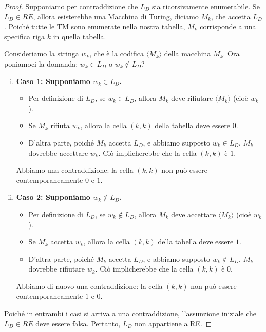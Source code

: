 \documentclass[a4paper]{article}
\begin{document}
\begin{proof}
Supponiamo per contraddizione che $L_D$ sia ricorsivamente enumerabile. Se $L_D \in RE$, allora esisterebbe una Macchina di Turing, diciamo $M_k$, che accetta $L_D$. Poiché tutte le TM sono enumerate nella nostra tabella, $M_k$ corrisponde a una specifica riga $k$ in quella tabella.

Consideriamo la stringa $w_k$, che è la codifica $\langle M_k \rangle$ della macchina $M_k$.
Ora poniamoci la domanda: $w_k \in L_D$ o $w_k \notin L_D$?

\begin{enumerate}[(i)]
    \item \textbf{Caso 1: Supponiamo $w_k \in L_D$.}
    \begin{itemize}
        \item Per definizione di $L_D$, se $w_k \in L_D$, allora $M_k$ deve rifiutare $\langle M_k \rangle$ (cioè $w_k$).
        \item Se $M_k$ rifiuta $w_k$, allora la cella $(k,k)$ della tabella deve essere $0$.
        \item D'altra parte, poiché $M_k$ accetta $L_D$, e abbiamo supposto $w_k \in L_D$, $M_k$ dovrebbe accettare $w_k$. Ciò implicherebbe che la cella $(k,k)$ è $1$.
    \end{itemize}
    Abbiamo una contraddizione: la cella $(k,k)$ non può essere contemporaneamente $0$ e $1$.

    \item \textbf{Caso 2: Supponiamo $w_k \notin L_D$.}
    \begin{itemize}
        \item Per definizione di $L_D$, se $w_k \notin L_D$, allora $M_k$ deve accettare $\langle M_k \rangle$ (cioè $w_k$).
        \item Se $M_k$ accetta $w_k$, allora la cella $(k,k)$ della tabella deve essere $1$.
        \item D'altra parte, poiché $M_k$ accetta $L_D$, e abbiamo supposto $w_k \notin L_D$, $M_k$ dovrebbe rifiutare $w_k$. Ciò implicherebbe che la cella $(k,k)$ è $0$.
    \end{itemize}
    Abbiamo di nuovo una contraddizione: la cella $(k,k)$ non può essere contemporaneamente $1$ e $0$.
\end{enumerate}
Poiché in entrambi i casi si arriva a una contraddizione, l'assunzione iniziale che $L_D \in RE$ deve essere falsa. Pertanto, $L_D$ non appartiene a RE.
\end{proof}
\end{document}

